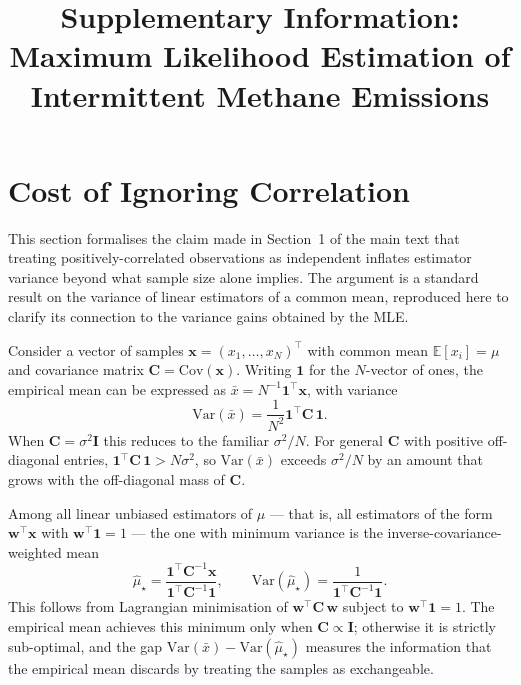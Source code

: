 \documentclass[11pt]{article}
\title{Supplementary Information:\\Maximum Likelihood Estimation of Intermittent Methane Emissions}
\author{}
\date{}
\newcommand{\new}[1]{{\color{blue}#1}}
\newcommand{\Var}{\mathrm{Var}}
\begin{document}
\maketitle

\tableofcontents
\newpage

\section{Cost of Ignoring Correlation}
\label{sec:corr_mean_SI}

\new{This section formalises the claim made in Section~1 of the main text that treating positively-correlated observations as independent inflates estimator variance beyond what sample size alone implies. The argument is a standard result on the variance of linear estimators of a common mean, reproduced here to clarify its connection to the variance gains obtained by the MLE.}

\new{Consider a vector of samples $\mathbf{x} = (x_1, \ldots, x_N)^\top$ with common mean $\mathbb{E}[x_i] = \mu$ and covariance matrix $\mathbf{C} = \mathrm{Cov}(\mathbf{x})$. Writing $\mathbf{1}$ for the $N$-vector of ones, the empirical mean can be expressed as $\bar x = N^{-1} \mathbf{1}^\top \mathbf{x}$, with variance
\begin{equation}
    \Var(\bar x) = \frac{1}{N^2} \mathbf{1}^\top \mathbf{C}\, \mathbf{1}.
\end{equation}
When $\mathbf{C} = \sigma^2 \mathbf{I}$ this reduces to the familiar $\sigma^2/N$. For general $\mathbf{C}$ with positive off-diagonal entries, $\mathbf{1}^\top \mathbf{C}\, \mathbf{1} > N \sigma^2$, so $\Var(\bar x)$ exceeds $\sigma^2/N$ by an amount that grows with the off-diagonal mass of $\mathbf{C}$.}

\new{Among all linear unbiased estimators of $\mu$ — that is, all estimators of the form $\mathbf{w}^\top \mathbf{x}$ with $\mathbf{w}^\top \mathbf{1} = 1$ — the one with minimum variance is the inverse-covariance-weighted mean
\begin{equation}
    \hat\mu_\star 
    = \frac{\mathbf{1}^\top \mathbf{C}^{-1} \mathbf{x}}{\mathbf{1}^\top \mathbf{C}^{-1} \mathbf{1}},
    \qquad
    \Var(\hat\mu_\star) = \frac{1}{\mathbf{1}^\top \mathbf{C}^{-1} \mathbf{1}}.
    \label{eq:gls_SI}
\end{equation}
This follows from Lagrangian minimisation of $\mathbf{w}^\top \mathbf{C}\, \mathbf{w}$ subject to $\mathbf{w}^\top \mathbf{1} = 1$. The empirical mean achieves this minimum only when $\mathbf{C} \propto \mathbf{I}$; otherwise it is strictly sub-optimal, and the gap $\Var(\bar x) - \Var(\hat\mu_\star)$ measures the information that the empirical mean discards by treating the samples as exchangeable.}
\end{document}

